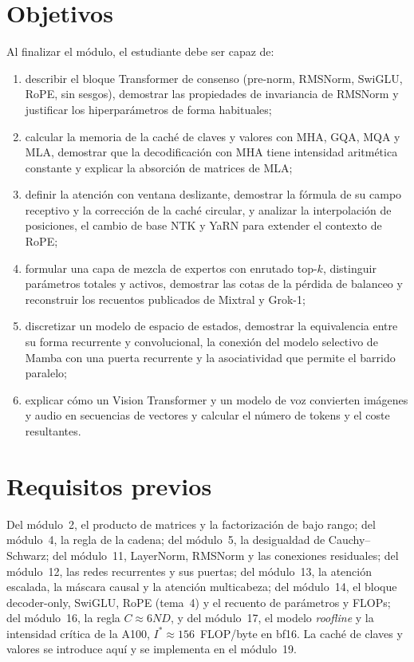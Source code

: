 \documentclass[11pt,a4paper,twoside,openany]{book}
\newcommand{\Icrit}{I^{\ast}}
\begin{document}
\section*{Objetivos}
Al finalizar el módulo, el estudiante debe ser capaz de:
\begin{enumerate}[label=\arabic*.]
  \item describir el bloque Transformer de consenso (pre-norm, RMSNorm, SwiGLU, RoPE, sin sesgos), demostrar las propiedades de invariancia de RMSNorm y justificar los hiperparámetros de forma habituales;
  \item calcular la memoria de la caché de claves y valores con MHA, GQA, MQA y MLA, demostrar que la decodificación con MHA tiene intensidad aritmética constante y explicar la absorción de matrices de MLA;
  \item definir la atención con ventana deslizante, demostrar la fórmula de su campo receptivo y la corrección de la caché circular, y analizar la interpolación de posiciones, el cambio de base NTK y YaRN para extender el contexto de RoPE;
  \item formular una capa de mezcla de expertos con enrutado top-$k$, distinguir parámetros totales y activos, demostrar las cotas de la pérdida de balanceo y reconstruir los recuentos publicados de Mixtral y Grok-1;
  \item discretizar un modelo de espacio de estados, demostrar la equivalencia entre su forma recurrente y convolucional, la conexión del modelo selectivo de Mamba con una puerta recurrente y la asociatividad que permite el barrido paralelo;
  \item explicar cómo un Vision Transformer y un modelo de voz convierten imágenes y audio en secuencias de vectores y calcular el número de tokens y el coste resultantes.
\end{enumerate}

\section*{Requisitos previos}
Del módulo~2, el producto de matrices y la factorización de bajo rango; del módulo~4, la regla de la cadena; del módulo~5, la desigualdad de Cauchy--Schwarz; del módulo~11, LayerNorm, RMSNorm y las conexiones residuales; del módulo~12, las redes recurrentes y sus puertas; del módulo~13, la atención escalada, la máscara causal y la atención multicabeza; del módulo~14, el bloque decoder-only, SwiGLU, RoPE (tema~4) y el recuento de parámetros y FLOPs; del módulo~16, la regla $C\approx 6ND$, y del módulo~17, el modelo \emph{roofline} y la intensidad crítica de la A100, $\Icrit\approx 156$~FLOP/byte en bf16. La caché de claves y valores se introduce aquí y se implementa en el módulo~19.
\end{document}
